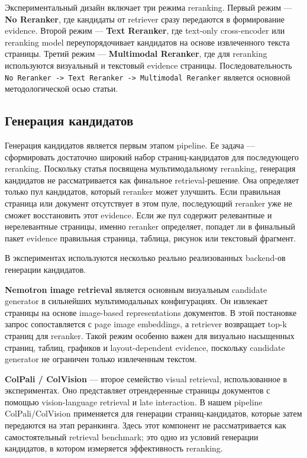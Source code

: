 \documentclass[conference]{IEEEtran}
\begin{document}
Экспериментальный дизайн включает три режима reranking. Первый режим --- \textbf{No Reranker}, где кандидаты от retriever сразу передаются в формирование evidence. Второй режим --- \textbf{Text Reranker}, где text-only cross-encoder или reranking model переупорядочивает кандидатов на основе извлеченного текста страницы. Третий режим --- \textbf{Multimodal Reranker}, где для reranking используются визуальный и текстовый evidence страницы. Последовательность \texttt{No Reranker -> Text Reranker -> Multimodal Reranker} является основной методологической осью статьи.

\subsection{Генерация кандидатов}

Генерация кандидатов является первым этапом pipeline. Ее задача --- сформировать достаточно широкий набор страниц-кандидатов для последующего reranking. Поскольку статья посвящена мультимодальному reranking, генерация кандидатов не рассматривается как финальное retrieval-решение. Она определяет только пул кандидатов, который reranker может улучшить. Если правильная страница или документ отсутствует в этом пуле, последующий reranker уже не сможет восстановить этот evidence. Если же пул содержит релевантные и нерелевантные страницы, именно reranker определяет, попадет ли в финальный пакет evidence правильная страница, таблица, рисунок или текстовый фрагмент.

В экспериментах используются несколько реально реализованных backend-ов генерации кандидатов.

\textbf{Nemotron image retrieval} является основным визуальным candidate generator в сильнейших мультимодальных конфигурациях. Он извлекает страницы на основе image-based representations документов. В этой постановке запрос сопоставляется с page image embeddings, а retriever возвращает top-k страниц для reranker. Такой режим особенно важен для визуально насыщенных страниц, таблиц, графиков и layout-dependent evidence, поскольку candidate generator не ограничен только извлеченным текстом.

\textbf{ColPali / ColVision} --- второе семейство visual retrieval, использованное в экспериментах. Оно представляет отрендеренные страницы документов с помощью vision-language retrieval и late interaction. В нашем pipeline ColPali/ColVision применяется для генерации страниц-кандидатов, которые затем передаются на этап реранкинга. Здесь этот компонент не рассматривается как самостоятельный retrieval benchmark; это одно из условий генерации кандидатов, в котором измеряется эффективность reranking.
\end{document}
